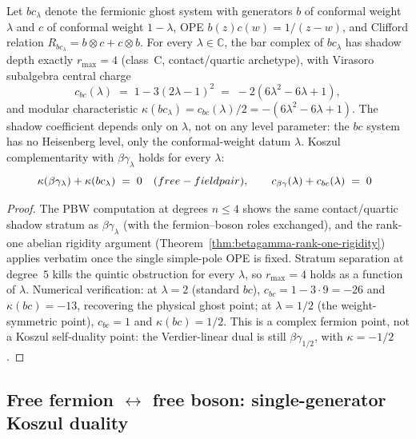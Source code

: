 \begin{proposition}
\label{prop:bc-general-spin-class-c}
\ClaimStatusProvedElsewhere
{}
Let $bc_\lambda$ denote the fermionic ghost system with generators $b$
of conformal weight $\lambda$ and $c$ of conformal weight $1 - \lambda$,
OPE $b(z)c(w) = 1/(z-w)$, and Clifford relation
$R_{bc_\lambda} = b \otimes c + c \otimes b$. For every $\lambda \in
\mathbb{C}$, the bar complex of $bc_\lambda$ has shadow depth exactly
$r_{\max} = 4$ (class~C, contact/quartic archetype), with Virasoro
subalgebra central charge
\[
 c_{bc}(\lambda) \;=\; 1 - 3(2\lambda - 1)^2
 \;=\; -2(6\lambda^2 - 6\lambda + 1),
\]
and modular characteristic
$\kappa(bc_\lambda) = c_{bc}(\lambda)/2 = -(6\lambda^2 - 6\lambda + 1)$.
The shadow coefficient depends only on $\lambda$, not on any level
parameter: the $bc$ system has no Heisenberg level, only the
conformal-weight datum $\lambda$. Koszul complementarity with $\beta\gamma_\lambda$
holds for every $\lambda$:
\[
 \kappa(\beta\gamma_\lambda) + \kappa(bc_\lambda) \;=\; 0 \quad\textup{(}free-field pair\textup{)},
 \qquad c_{\beta\gamma}(\lambda) + c_{bc}(\lambda) \;=\; 0
 \;\; \]
\end{proposition}

\begin{proof}
The PBW computation at degrees $n \leq 4$ shows the same contact/quartic
shadow stratum as $\beta\gamma_\lambda$ (with the fermion--boson roles
exchanged), and the rank-one abelian rigidity argument
(Theorem~\ref{thm:betagamma-rank-one-rigidity}) applies verbatim once
the single simple-pole OPE is fixed. Stratum separation at degree~$5$
kills the quintic obstruction for every $\lambda$, so $r_{\max} = 4$
holds as a function of $\lambda$. Numerical verification:
at $\lambda = 2$ (standard $bc$), $c_{bc} = 1 - 3 \cdot 9 = -26$ and
$\kappa(bc) = -13$, recovering the physical ghost point;
at $\lambda = 1/2$ (the weight-symmetric point), $c_{bc} = 1$ and
$\kappa(bc) = 1/2$. This is a complex fermion point, not a
Koszul self-duality point: the Verdier-linear dual is still
$\beta\gamma_{1/2}$, with $\kappa=-1/2$.
\end{proof}


\subsection{\texorpdfstring{Free fermion $\leftrightarrow$ free boson: single-generator Koszul duality}{Free fermion--free boson: single-generator Koszul duality}}

